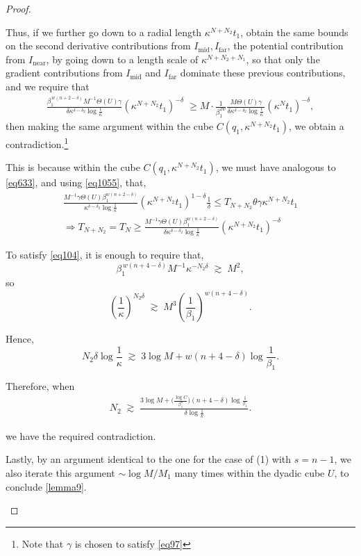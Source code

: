 \documentclass{article}
\newcounter{lem}
\theoremstyle{plain}
\theoremstyle{plain}
\newcommand{\thee}{\Theta(U)}
\theoremstyle{definition}
\theoremstyle{plain}
\begin{document}
\begin{proof}
\begin{itemize}
Thus, if we further go down to a radial length \( \kappa^{N+N_2} t_1 \), obtain the same bounds on the second derivative contributions from $I_{\text{mid}}, I_{\text{far}}$, the potential contribution from $I_{\text{near}}$, by going down to a length scale of $\kappa^{N+N_2 +N_1}$, so that only the gradient contributions from $I_{\text{mid}}$ and $I_{\text{far}}$ dominate these previous contributions, and we require that
\begin{align}\label{eq104}
\frac{\beta_1^{\,w(n+2-\delta)} M^{-1}\thee \gamma}
{\, \delta\kappa^{\delta-\delta_2} \log \frac{1}{\kappa}\,}
\left( \kappa^{N+N_2} t_1 \right)^{-\delta}
\;\geq
M\cdot \frac{1}{\beta_{1}^{2w}} \frac{M\thee\gamma }{\delta \kappa^{\delta-\delta_2} \log \frac{1}{\kappa}\, }
\left( \kappa^{N} t_1 \right)^{-\delta},
\end{align}
then making the same argument within the cube
\( C(q_1, \kappa^{N+N_2} t_1) \),
we obtain a contradiction.\footnote{Note that $\gamma$ is chosen to satisfy \cref{eq97}}

This is because within the cube $C(q_1,\kappa^{N+N_2}t_1)$, we must have analogous to \cref{eq633}, and using \cref{eq1055}, that, 
\begin{multline}
     \frac{M^{-1}\gamma\thee\beta_1^{w(n+2-\delta)}}{\kappa^{\delta-\delta_2 }\log \frac{1}{\kappa}}
(\kappa^{N+N_2} t_1)^{1-\delta}\frac{1}{\delta}\leq T_{N+N_2} \theta \gamma \kappa^{N+N_2}t_1  \\ \Rightarrow T_{N+N_2}=T_N\geq \frac{M^{-1}\gamma\thee\beta_1^{w(n+2-\delta)}}{\delta\kappa^{\delta-\delta_2 }\log \frac{1}{\kappa}}
(\kappa^{N+N_2} t_1)^{-\delta}
\end{multline}

To satisfy \cref{eq104}, it is enough to require that,
\[
\beta_1^{\,w(n+4-\delta)} M^{-1} \kappa^{-N_2 \delta}
\;\gtrsim\; M^2,
\]
so
\[
\left( \frac{1}{\kappa} \right)^{N_2 \delta}
\;\gtrsim\;
M^3 \left( \frac{1}{\beta_1} \right)^{w(n+4-\delta)}.
\]

Hence,
\[
N_2 \delta \log \frac{1}{\kappa}
\;\gtrsim\;
3\log M + w(n+4-\delta)\log \frac{1}{\beta_1}.
\]

Therefore, when
\begin{align}
N_2
\;\gtrsim\;
\frac{
3\log M
+ \bigl( \frac{\log C}{\beta_1^n} \bigr)(n+4-\delta)\log \frac{1}{\beta_1}
}{
\delta \log \frac{1}{\kappa}
}.
\end{align}

 we have the required contradiction.

Lastly, by an argument identical to the one for the case of (1) with $s=n-1$, we also iterate this argument $\sim \log M/M_1$ many times within the dyadic cube $U$, to conclude \cref{lemma9}.
\end{itemize}
\end{proof}
\end{document}
